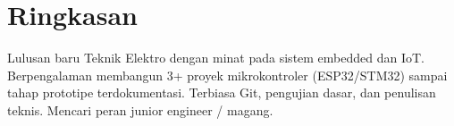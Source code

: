 \section{Ringkasan}
Lulusan baru Teknik Elektro dengan minat pada sistem embedded dan IoT.
Berpengalaman membangun 3+ proyek mikrokontroler (ESP32/STM32) sampai tahap
prototipe terdokumentasi. Terbiasa Git, pengujian dasar, dan penulisan teknis.
Mencari peran junior engineer / magang.
